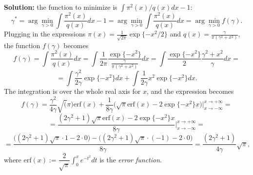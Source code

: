 \documentclass{article}
\begin{document}
\textbf{Solution:} the function to minimize is $ \int\pi^2(x)/q(x)dx -1 $:
\begin{equation}
\gamma^* = \arg\min_{\gamma>0} \int\frac{\pi^2(x)}{q(x)}dx -1 = \arg\min_{\gamma>0} \int\frac{\pi^2(x)}{q(x)}dx = \arg\min_{\gamma>0} f(\gamma).
\end{equation}
Plugging in the expressions $\pi(x) = \frac{1}{\sqrt{2\pi}}\exp\{-x^2/2\}$ and $q(x)=\frac{\gamma}{\pi(\gamma^2+x^2)}$, the function $f(\gamma)$ becomes
	\begin{equation}
		f(\gamma) = \int\frac{\pi^2(x)}{q(x)}dx = \int \frac{1}{2\pi}\frac{\exp\{-x^2\}}{\frac{\gamma}{\pi(\gamma^2+x^2)}}dx = \int \frac{\exp\{-x^2\}}{2}\frac{\gamma^2+x^2}{\gamma} dx =
	\end{equation}
	\begin{equation}
		= \int \frac{\gamma^2}{2\gamma}\exp\{-x^2\}dx + \int \frac{1}{2\gamma}x^2\exp\{-x^2\}dx.
	\end{equation}
The integration is over the whole real axis for $x$, and the expression becomes
	\begin{equation}
		f(\gamma)=\dfrac{\gamma^2}{4\gamma}\sqrt(\pi)\text{erf}(x) + \dfrac{1}{8\gamma}\Big(\sqrt{\pi}\text{erf}(x)-2\exp\{-x^2\}x\Big)\Bigg|_{x\rightarrow-\infty}^{x\rightarrow+\infty}=
	\end{equation}
	\begin{equation}
		=\dfrac{(2\gamma^2+1)\sqrt{\pi}\text{erf}(x)-2\exp\{-x^2\}x}{8\gamma}\Bigg|_{x\rightarrow-\infty}^{x\rightarrow+\infty} =
	\end{equation}
	\begin{equation}
		= \dfrac{\Big((2\gamma^2+1)\sqrt{\pi}\cdot 1 - 2\cdot 0\Big) - \Big((2\gamma^2+1)\sqrt{\pi}\cdot(-1) - 2\cdot 0\Big)}{8\gamma} = \dfrac{(2\gamma^2 +1 )}{4\gamma}\sqrt{\pi},
	\end{equation}
where $\text{erf}(x):= \dfrac{2}{\sqrt{\pi}}\int_{0}^{x}e^{-t^2}dt$ is the \textit{error function}.
\end{document}
